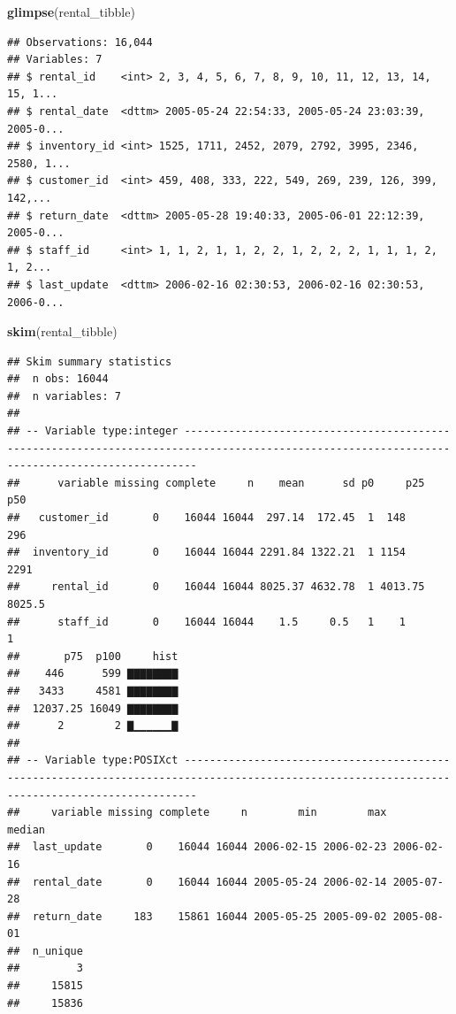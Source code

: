 \documentclass[]{book}
\newenvironment{Shaded}{\begin{snugshade}}{\end{snugshade}}
\newcommand{\KeywordTok}[1]{\textcolor[rgb]{0.13,0.29,0.53}{\textbf{#1}}}
\newcommand{\NormalTok}[1]{#1}
\theoremstyle{definition}
\theoremstyle{definition}
\theoremstyle{definition}
\theoremstyle{remark}
\begin{document}
\begin{Shaded}
\begin{Highlighting}[]
\KeywordTok{glimpse}\NormalTok{(rental_tibble)}
\end{Highlighting}
\end{Shaded}

\begin{verbatim}
## Observations: 16,044
## Variables: 7
## $ rental_id    <int> 2, 3, 4, 5, 6, 7, 8, 9, 10, 11, 12, 13, 14, 15, 1...
## $ rental_date  <dttm> 2005-05-24 22:54:33, 2005-05-24 23:03:39, 2005-0...
## $ inventory_id <int> 1525, 1711, 2452, 2079, 2792, 3995, 2346, 2580, 1...
## $ customer_id  <int> 459, 408, 333, 222, 549, 269, 239, 126, 399, 142,...
## $ return_date  <dttm> 2005-05-28 19:40:33, 2005-06-01 22:12:39, 2005-0...
## $ staff_id     <int> 1, 1, 2, 1, 1, 2, 2, 1, 2, 2, 2, 1, 1, 1, 2, 1, 2...
## $ last_update  <dttm> 2006-02-16 02:30:53, 2006-02-16 02:30:53, 2006-0...
\end{verbatim}

\begin{Shaded}
\begin{Highlighting}[]
\KeywordTok{skim}\NormalTok{(rental_tibble)}
\end{Highlighting}
\end{Shaded}

\begin{verbatim}
## Skim summary statistics
##  n obs: 16044 
##  n variables: 7 
## 
## -- Variable type:integer ----------------------------------------------------------------------------------------------------------------------------------------------
##      variable missing complete     n    mean      sd p0     p25    p50
##   customer_id       0    16044 16044  297.14  172.45  1  148     296  
##  inventory_id       0    16044 16044 2291.84 1322.21  1 1154    2291  
##     rental_id       0    16044 16044 8025.37 4632.78  1 4013.75 8025.5
##      staff_id       0    16044 16044    1.5     0.5   1    1       1  
##       p75  p100     hist
##    446      599 ▇▇▇▇▇▇▇▇
##   3433     4581 ▇▇▇▇▇▇▇▇
##  12037.25 16049 ▇▇▇▇▇▇▇▇
##      2        2 ▇▁▁▁▁▁▁▇
## 
## -- Variable type:POSIXct ----------------------------------------------------------------------------------------------------------------------------------------------
##     variable missing complete     n        min        max     median
##  last_update       0    16044 16044 2006-02-15 2006-02-23 2006-02-16
##  rental_date       0    16044 16044 2005-05-24 2006-02-14 2005-07-28
##  return_date     183    15861 16044 2005-05-25 2005-09-02 2005-08-01
##  n_unique
##         3
##     15815
##     15836
\end{verbatim}
\end{document}
